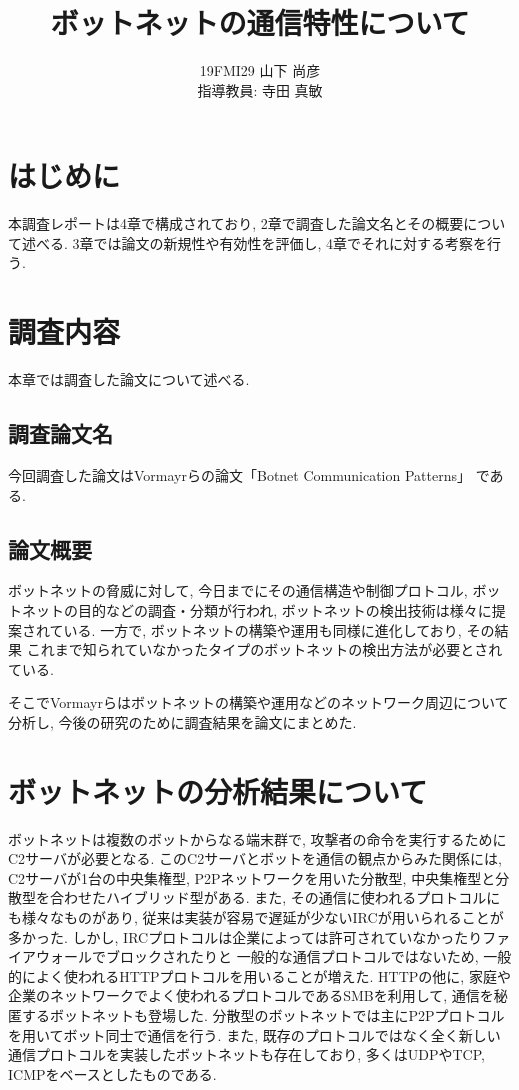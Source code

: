 \documentclass[twocolumn,9]{ltjsarticle}
\title{ボットネットの通信特性について}
\author{19FMI29 山下 尚彦 \\ 指導教員: 寺田 真敏}
\date{}
\begin{document}
\maketitle

\section{はじめに}
本調査レポートは4章で構成されており, 2章で調査した論文名とその概要について述べる. 
3章では論文の新規性や有効性を評価し, 4章でそれに対する考察を行う. 

\section{調査内容}
本章では調査した論文について述べる. 

\subsection{調査論文名}
今回調査した論文はVormayrらの論文「Botnet Communication Patterns」
\cite{vormayr2017botnet}である. 

\subsection{論文概要}
ボットネットの脅威に対して, 今日までにその通信構造や制御プロトコル, ボットネットの目的などの調査・分類が行われ, 
ボットネットの検出技術は様々に提案されている. 一方で, ボットネットの構築や運用も同様に進化しており, その結果
これまで知られていなかったタイプのボットネットの検出方法が必要とされている. 

そこでVormayrらはボットネットの構築や運用などのネットワーク周辺について分析し, 
今後の研究のために調査結果を論文にまとめた. 

\section{ボットネットの分析結果について}
ボットネットは複数のボットからなる端末群で, 攻撃者の命令を実行するためにC2サーバが必要となる. 
このC2サーバとボットを通信の観点からみた関係には, C2サーバが1台の中央集権型, P2Pネットワークを用いた分散型, 
中央集権型と分散型を合わせたハイブリッド型がある. また, その通信に使われるプロトコルにも様々なものがあり, 
従来は実装が容易で遅延が少ないIRCが用いられることが多かった. 
しかし, IRCプロトコルは企業によっては許可されていなかったりファイアウォールでブロックされたりと
一般的な通信プロトコルではないため, 一般的によく使われるHTTPプロトコルを用いることが増えた. 
HTTPの他に, 家庭や企業のネットワークでよく使われるプロトコルであるSMBを利用して, 通信を秘匿するボットネットも登場した. 
分散型のボットネットでは主にP2Pプロトコルを用いてボット同士で通信を行う. 
また, 既存のプロトコルではなく全く新しい通信プロトコルを実装したボットネットも存在しており, 
多くはUDPやTCP, ICMPをベースとしたものである. 
\end{document}

